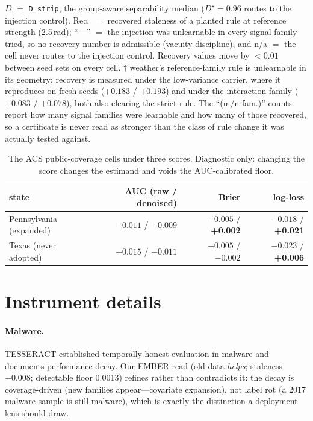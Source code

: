 \documentclass[10pt]{article} %
\begin{document}
\begin{table}[t]
\vspace{2pt}
{\scriptsize $D$ $=$ \texttt{D\_strip}, the group-aware separability median ($D^\star = 0.96$ routes
to the injection control). Rec.\ $=$ recovered staleness of a planted rule at reference strength (2.5\,rad);
``---'' $=$ the injection was unlearnable in every signal family tried, so no recovery number is
admissible (vacuity discipline), and n/a $=$ the cell never routes to the injection control.
Recovery values move by ${<}0.01$ between seed sets on every cell. $\dagger$ weather's
reference-family rule is unlearnable in its geometry; recovery is measured under the low-variance
carrier, where it reproduces on fresh seeds ($+0.183$ / $+0.193$) and under the interaction family
($+0.083$ / $+0.078$), both also clearing the strict rule. The ``(m/n fam.)'' counts report how
many signal families were learnable and how many of those recovered, so a certificate is never
read as stronger than the class of rule change it was actually tested against.}
\end{table}

\begin{table}[t]
\centering
\small
\caption{The ACS public-coverage cells under three scores. Diagnostic only: changing the score changes the estimand and voids the AUC-calibrated floor.}
\label{tab:4}
\begin{tabular}{@{}lrrr@{}}
\toprule
state & AUC (raw / denoised) & Brier & log-loss \\
\midrule
Pennsylvania (expanded) & $-0.011$ / $-0.009$ & $-0.005$ / \textbf{+0.002} & $-0.018$ / \textbf{+0.021} \\
Texas (never adopted) & $-0.015$ / $-0.011$ & $-0.005$ / $-0.002$ & $-0.023$ / \textbf{+0.006} \\
\bottomrule
\end{tabular}
\end{table}

\section{Instrument details}\label{app:instrument}

\paragraph{Malware.} TESSERACT \citep{pendlebury2019tesseract} established temporally honest evaluation in
malware and documents performance decay. Our EMBER read (old data \emph{helps}; staleness $-0.008$;
detectable floor 0.0013) refines rather than contradicts it: the decay is coverage-driven (new
families appear---covariate expansion), not label rot (a 2017 malware sample is still malware),
which is exactly the distinction a deployment lens should draw.
\end{document}
